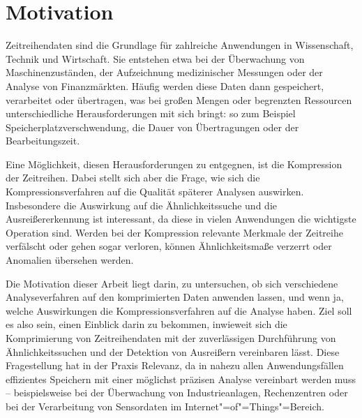 \section{Motivation}

Zeitreihendaten sind die Grundlage für zahlreiche Anwendungen in Wissenschaft, Technik und Wirtschaft. Sie entstehen etwa bei der Überwachung von Maschinenzuständen, der Aufzeichnung medizinischer Messungen oder der Analyse von Finanzmärkten. Häufig werden diese Daten dann gespeichert, verarbeitet oder übertragen, was bei großen Mengen oder begrenzten Ressourcen unterschiedliche Herausforderungen mit sich bringt: so zum Beispiel Speicherplatzverschwendung, die Dauer von Übertragungen oder der Bearbeitungszeit.

Eine Möglichkeit, diesen Herausforderungen zu entgegnen, ist die Kompression der Zeitreihen. Dabei stellt sich aber die Frage, wie sich die Kompressionsverfahren auf die Qualität späterer Analysen auswirken. Insbesondere die Auswirkung auf die Ähnlichkeitssuche und die Ausreißererkennung ist interessant, da diese in vielen Anwendungen die wichtigste Operation sind. Werden bei der Kompression relevante Merkmale der Zeitreihe verfälscht oder gehen sogar verloren, können Ähnlichkeitsmaße verzerrt oder Anomalien übersehen werden.

Die Motivation dieser Arbeit liegt darin, zu untersuchen, ob sich verschiedene Analyseverfahren auf den komprimierten Daten anwenden lassen, und wenn ja, welche Auswirkungen die Kompressionsverfahren auf die Analyse haben. Ziel soll es also sein, einen Einblick darin zu bekommen, inwieweit sich die Komprimierung von Zeitreihendaten mit der zuverlässigen Durchführung von Ähnlichkeitssuchen und der Detektion von Ausreißern vereinbaren lässt. Diese Fragestellung hat in der Praxis Relevanz, da in nahezu allen Anwendungsfällen effizientes Speichern mit einer möglichst präzisen Analyse vereinbart werden muss -- beispielsweise bei der Überwachung von Industrieanlagen, Rechenzentren oder bei der Verarbeitung von Sensordaten im Internet"=of"=Things"=Bereich.